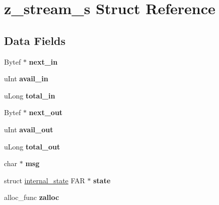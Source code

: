 \hypertarget{structz__stream__s}{}\section{z\+\_\+stream\+\_\+s Struct Reference}
\label{structz__stream__s}
\subsection*{Data Fields}
\begin{DoxyCompactItemize}
\item 
\mbox{\label{structz__stream__s_a2e4858ba97e3502905f927dcf7a81a7a}} 
Bytef $\ast$ {\bfseries next\+\_\+in}
\item 
\mbox{\label{structz__stream__s_a0cf177f50dbb49692f27480cbcfde794}} 
u\+Int {\bfseries avail\+\_\+in}
\item 
\mbox{\label{structz__stream__s_aa8f408b9632737dc21519fa1ed34b08d}} 
u\+Long {\bfseries total\+\_\+in}
\item 
\mbox{\label{structz__stream__s_a58f1e32c5e5e9860fc29267eab01c573}} 
Bytef $\ast$ {\bfseries next\+\_\+out}
\item 
\mbox{\label{structz__stream__s_a45ad2364307af9d944fd39d4eca3ca3c}} 
u\+Int {\bfseries avail\+\_\+out}
\item 
\mbox{\label{structz__stream__s_abae26f1f236cf920250b9d37fdf009c1}} 
u\+Long {\bfseries total\+\_\+out}
\item 
\mbox{\label{structz__stream__s_a581e9d2e5296503e1537286b359a18c1}} 
char $\ast$ {\bfseries msg}
\item 
\mbox{\label{structz__stream__s_acad0cbe87a267f2321e95f6bf7752af3}} 
struct \mbox{\hyperlink{structinternal__state}{internal\+\_\+state}} F\+AR $\ast$ {\bfseries state}
\item 
\mbox{\label{structz__stream__s_a23a2299c384f808e76e9908f21216b0f}} 
alloc\+\_\+func {\bfseries zalloc}
\item 

\end{DoxyCompactItemize}
